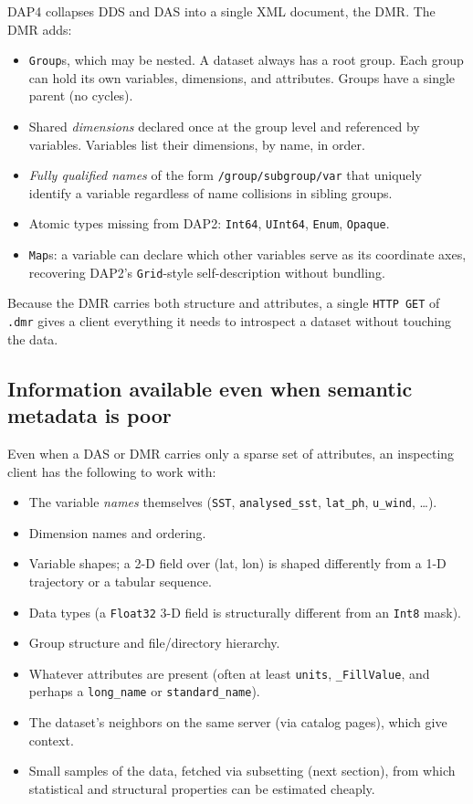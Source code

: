 \documentclass[11pt]{article}
\begin{document}
DAP4 collapses DDS and DAS into a single XML document, the DMR. The
DMR adds:
\begin{itemize}
  \item \texttt{Group}s, which may be nested. A dataset always has a
    root group. Each group can hold its own variables, dimensions,
    and attributes. Groups have a single parent (no cycles).
  \item Shared \emph{dimensions} declared once at the group level and
    referenced by variables. Variables list their dimensions, by
    name, in order.
  \item \emph{Fully qualified names} of the form
    \texttt{/group/subgroup/var} that uniquely identify a variable
    regardless of name collisions in sibling groups.
  \item Atomic types missing from DAP2:
    \texttt{Int64}, \texttt{UInt64}, \texttt{Enum}, \texttt{Opaque}.
  \item \texttt{Map}s: a variable can declare which other variables
    serve as its coordinate axes, recovering DAP2's
    \texttt{Grid}-style self-description without bundling.
\end{itemize}
Because the DMR carries both structure and attributes, a single
\texttt{HTTP GET} of \texttt{.dmr} gives a client everything it needs
to introspect a dataset without touching the data.

\subsection{Information available even when semantic metadata is poor}

Even when a DAS or DMR carries only a sparse set of attributes, an
inspecting client has the following to work with:
\begin{itemize}
  \item The variable \emph{names} themselves (\texttt{SST},
    \texttt{analysed\_sst}, \texttt{lat\_ph}, \texttt{u\_wind}, \ldots).
  \item Dimension names and ordering.
  \item Variable shapes; a 2-D field over (lat, lon) is shaped
    differently from a 1-D trajectory or a tabular sequence.
  \item Data types (a \texttt{Float32} 3-D field is structurally
    different from an \texttt{Int8} mask).
  \item Group structure and file/directory hierarchy.
  \item Whatever attributes are present (often at least
    \texttt{units}, \texttt{\_FillValue}, and perhaps a
    \texttt{long\_name} or \texttt{standard\_name}).
  \item The dataset's neighbors on the same server (via catalog
    pages), which give context.
  \item Small samples of the data, fetched via subsetting (next
    section), from which statistical and structural properties can
    be estimated cheaply.
\end{itemize}
\end{document}
